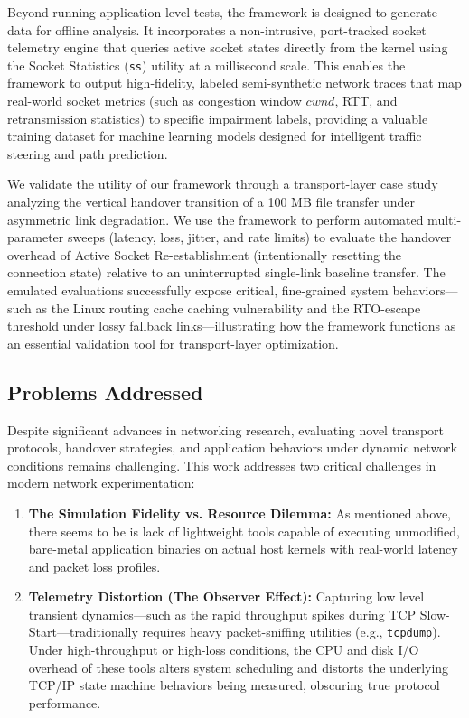 \documentclass[conference]{IEEEtran}
\begin{document}
Beyond running application-level tests, the framework is designed to generate data for offline analysis. It incorporates a non-intrusive, port-tracked socket telemetry engine that queries active socket states directly from the kernel using the Socket Statistics (\texttt{ss}) utility \cite{ssutility} at a millisecond scale. This enables the framework to output high-fidelity, labeled semi-synthetic network traces that map real-world socket metrics (such as congestion window $cwnd$\cite{jacobson1988congestion}, RTT, and retransmission statistics) to specific impairment labels, providing a valuable training dataset for machine learning models designed for intelligent traffic steering and path prediction.

We validate the utility of our framework through a transport-layer case study analyzing the vertical handover transition of a 100 MB file transfer under asymmetric link degradation. We use the framework to perform automated multi-parameter sweeps (latency, loss, jitter, and rate limits) to evaluate the handover overhead of Active Socket Re-establishment (intentionally resetting the connection state) relative to an uninterrupted single-link baseline transfer. The emulated evaluations successfully expose critical, fine-grained system behaviors—such as the Linux routing cache caching vulnerability and the RTO-escape threshold under lossy fallback links—illustrating how the framework functions as an essential validation tool for transport-layer optimization.

\subsection*{Problems Addressed}
Despite significant advances in networking research, evaluating novel transport protocols, handover strategies, and application behaviors under dynamic network conditions remains challenging. This work addresses two critical challenges  in modern network experimentation:

\begin{enumerate}
    \item \textbf{The Simulation Fidelity vs. Resource Dilemma:} 
As mentioned above, there seems to be is  lack of lightweight tools capable of executing unmodified, bare-metal application binaries on actual host kernels with real-world latency and packet loss profiles.

    \item \textbf{Telemetry Distortion (The Observer Effect):} 
    Capturing  low level transient dynamics—such as the rapid throughput spikes during TCP Slow-Start—traditionally requires heavy packet-sniffing utilities (e.g., \texttt{tcpdump}). Under high-throughput or high-loss conditions, the CPU and disk I/O overhead of these tools alters system scheduling and distorts the underlying TCP/IP state machine behaviors being measured, obscuring true protocol performance.
\end{enumerate}
\end{document}
